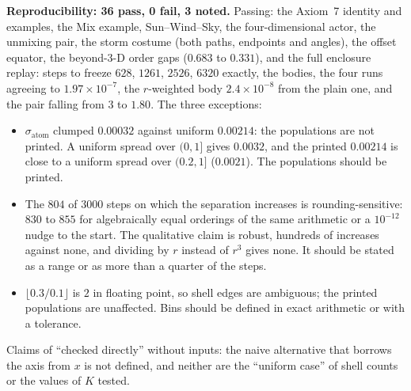 \documentclass[11pt]{article}
\begin{document}
\textbf{Reproducibility: 36 pass, 0 fail, 3 noted.} Passing: the Axiom~7
identity and examples, the Mix example, Sun--Wind--Sky, the
four-dimensional actor, the unmixing pair, the storm costume (both paths,
endpoints and angles), the offset equator, the beyond-3-D order gaps
($0.683$ to $0.331$), and the full enclosure replay: steps to freeze $628$,
$1261$, $2526$, $6320$ exactly, the bodies, the four runs agreeing to
$1.97\times10^{-7}$, the $r$-weighted body $2.4\times10^{-8}$ from the
plain one, and the pair falling from $3$ to $1.80$. The three exceptions:
\begin{itemize}
\item $\sigma_{\text{atom}}$ clumped $0.00032$ against uniform $0.00214$:
the populations are not printed. A uniform spread over $(0,1]$ gives
$0.0032$, and the printed $0.00214$ is close to a uniform spread over
$(0.2,1]$ ($0.0021$). The populations should be printed.
\item The $804$ of $3000$ steps on which the separation increases is
rounding-sensitive: $830$ to $855$ for algebraically equal orderings of the
same arithmetic or a $10^{-12}$ nudge to the start. The qualitative claim
is robust, hundreds of increases against none, and dividing by $r$ instead
of $r^3$ gives none. It should be stated as a range or as more than a
quarter of the steps.
\item $\lfloor0.3/0.1\rfloor$ is $2$ in floating point, so shell edges are
ambiguous; the printed populations are unaffected. Bins should be defined
in exact arithmetic or with a tolerance.
\end{itemize}
Claims of ``checked directly'' without inputs: the naive alternative that
borrows the axis from $x$ is not defined, and neither are the ``uniform
case'' of shell counts or the values of $K$ tested.
\end{document}
